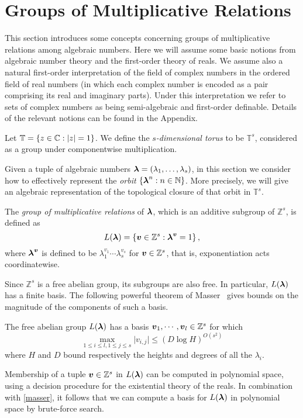 \section{Groups of Multiplicative Relations}
\label{sec:mult}

This section introduces some concepts concerning groups of
multiplicative relations among algebraic numbers.  Here we will assume
some basic notions from algebraic number theory and the first-order
theory of reals.  We assume also a natural first-order interpretation of
the field of complex numbers in the ordered field of real numbers (in
which each complex number is encoded as a pair comprising its real and
imaginary parts).  Under this interpretation we refer to sets of
complex numbers as being semi-algebraic and first-order definable.
Details of the relevant notions can be found in the Appendix.

Let $\mathbb{T}=\lbrace z\in\mathbb{C}: \lvert z\rvert =1\rbrace$.  We
define the \emph{$s$-dimensional torus} to be $\mathbb{T}^s$,
considered as a group under componentwise multiplication.

Given a tuple of algebraic numbers
$\boldsymbol\lambda=(\lambda_1,\ldots,\lambda_s)$, in this section we
consider how to effectively represent the \emph{orbit} $\{
\boldsymbol\lambda^n : n \in \mathbb{N}\}$.  More
precisely, we will give an algebraic representation of the topological
closure of that orbit in $\mathbb{T}^s$.

The \emph{group of multiplicative relations} of
$\boldsymbol{\lambda}$, which is an additive subgroup of
$\mathbb{Z}^s$, is defined as
\begin{equation*}
L(\boldsymbol{\lambda})=\lbrace \boldsymbol{v}\in \mathbb{Z}^s : \boldsymbol\lambda^{\boldsymbol v}=1 \rbrace \, ,
\end{equation*}
where $\boldsymbol\lambda^{\boldsymbol v}$ is defined to be
$\lambda_1^{v_1}\cdots\lambda_s^{v_s}$ for $\boldsymbol{v}\in \mathbb{Z}^s$, that is, exponentiation acts
coordinatewise.

Since $\mathbb{Z}^s$ is a free abelian group, its subgroups are also
free.  In particular, $L(\boldsymbol\lambda)$ has a finite basis. The
following powerful theorem of Masser~\cite{Mas88} gives bounds on the
magnitude of the components of such a basis.

\begin{theorem}[Masser]
\label{masser}
The free abelian group $L(\boldsymbol{\lambda})$ has a basis $\boldsymbol{v}_1,\cdots,\boldsymbol{v}_l\in\mathbb{Z}^s$ for which
\[ \max\limits_{1\leq i\leq l,1\leq j\leq s} \lvert v_{i,j} \rvert \leq (D\log H)^{O(s^2)} \]
where $H$ and $D$ bound respectively the heights and degrees of all the $\lambda_i$.
\end{theorem}
Membership of a tuple $\boldsymbol{v}\in \mathbb{Z}^s$ in
$L(\boldsymbol{\lambda})$ can be computed in polynomial space, using a
decision procedure for the existential theory of the reals.  In
combination with \cref{masser}, it follows that we can compute
a basis for $L(\boldsymbol{\lambda})$ in polynomial space by
brute-force search.

